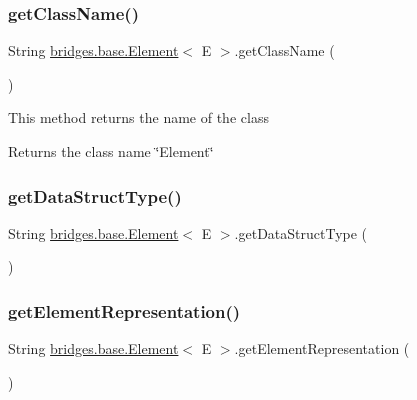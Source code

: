 \subsubsection{\texorpdfstring{get\+Class\+Name()}{getClassName()}}
{\footnotesize\ttfamily String \mbox{\hyperlink{classbridges_1_1base_1_1_element}{bridges.\+base.\+Element}}$<$ E $>$.get\+Class\+Name (\begin{DoxyParamCaption}{ }\end{DoxyParamCaption})}

This method returns the name of the class \begin{DoxyReturn}{Returns}
the class name \char`\"{}\+Element\char`\"{} 
\end{DoxyReturn}
\mbox{\label{classbridges_1_1base_1_1_element_a6a1b70fa4b1936d10c6deb433acf8cd9}} 
\subsubsection{\texorpdfstring{get\+Data\+Struct\+Type()}{getDataStructType()}}
{\footnotesize\ttfamily String \mbox{\hyperlink{classbridges_1_1base_1_1_element}{bridges.\+base.\+Element}}$<$ E $>$.get\+Data\+Struct\+Type (\begin{DoxyParamCaption}{ }\end{DoxyParamCaption})}

\mbox{\label{classbridges_1_1base_1_1_element_a8822450cfaf8495bc955d777ad35ea3f}} 
\subsubsection{\texorpdfstring{get\+Element\+Representation()}{getElementRepresentation()}}
{\footnotesize\ttfamily String \mbox{\hyperlink{classbridges_1_1base_1_1_element}{bridges.\+base.\+Element}}$<$ E $>$.get\+Element\+Representation (\begin{DoxyParamCaption}{ }\end{DoxyParamCaption})}

